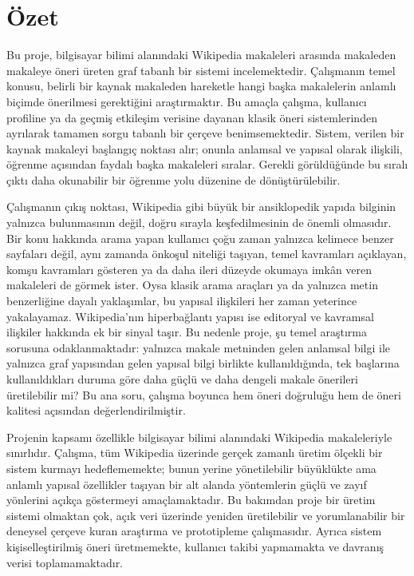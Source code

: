 \chapter{Özet}

Bu proje, bilgisayar bilimi alanındaki Wikipedia makaleleri arasında makaleden
makaleye öneri üreten graf tabanlı bir sistemi incelemektedir. Çalışmanın
temel konusu, belirli bir kaynak makaleden hareketle hangi başka makalelerin
anlamlı biçimde önerilmesi gerektiğini araştırmaktır. Bu amaçla çalışma,
kullanıcı profiline ya da geçmiş etkileşim verisine dayanan klasik öneri
sistemlerinden ayrılarak tamamen sorgu tabanlı bir çerçeve benimsemektedir.
Sistem, verilen bir kaynak makaleyi başlangıç noktası alır; onunla anlamsal ve
yapısal olarak ilişkili, öğrenme açısından faydalı başka makaleleri sıralar.
Gerekli görüldüğünde bu sıralı çıktı daha okunabilir bir öğrenme yolu düzenine
de dönüştürülebilir.

Çalışmanın çıkış noktası, Wikipedia gibi büyük bir ansiklopedik yapıda
bilginin yalnızca bulunmasının değil, doğru sırayla keşfedilmesinin de önemli
olmasıdır. Bir konu hakkında arama yapan kullanıcı çoğu zaman yalnızca
kelimece benzer sayfaları değil, aynı zamanda önkoşul niteliği taşıyan, temel
kavramları açıklayan, komşu kavramları gösteren ya da daha ileri düzeyde
okumaya imkân veren makaleleri de görmek ister. Oysa klasik arama araçları ya
da yalnızca metin benzerliğine dayalı yaklaşımlar, bu yapısal ilişkileri her
zaman yeterince yakalayamaz. Wikipedia'nın hiperbağlantı yapısı ise editoryal
ve kavramsal ilişkiler hakkında ek bir sinyal taşır. Bu nedenle proje, şu temel
araştırma sorusuna odaklanmaktadır: yalnızca makale metninden gelen anlamsal
bilgi ile yalnızca graf yapısından gelen yapısal bilgi birlikte
kullanıldığında, tek başlarına kullanıldıkları duruma göre daha güçlü ve daha
dengeli makale önerileri üretilebilir mi? Bu ana soru, çalışma boyunca hem
öneri doğruluğu hem de öneri kalitesi açısından değerlendirilmiştir.

Projenin kapsamı özellikle bilgisayar bilimi alanındaki Wikipedia makaleleriyle
sınırlıdır. Çalışma, tüm Wikipedia üzerinde gerçek zamanlı üretim ölçekli bir
sistem kurmayı hedeflememekte; bunun yerine yönetilebilir büyüklükte ama
anlamlı yapısal özellikler taşıyan bir alt alanda yöntemlerin güçlü ve zayıf
yönlerini açıkça göstermeyi amaçlamaktadır. Bu bakımdan proje bir üretim
sistemi olmaktan çok, açık veri üzerinde yeniden üretilebilir ve
yorumlanabilir bir deneysel çerçeve kuran araştırma ve prototipleme
çalışmasıdır. Ayrıca sistem kişiselleştirilmiş öneri üretmemekte, kullanıcı
takibi yapmamakta ve davranış verisi toplamamaktadır.

